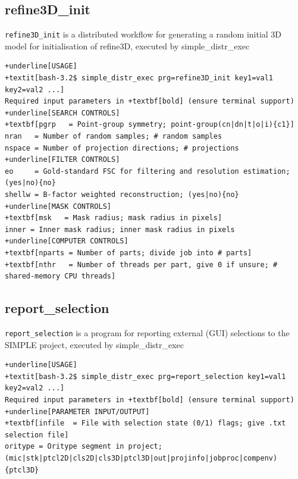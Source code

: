 \documentclass[a4paper,11pt]{article}
\newcommand{\prgname}[1]{\textcolor{NavyBlue}{\texttt{#1}}}
\begin{document}
\subsection{refine3D\_init}
\label{refine3D_init}
\prgname{refine3D\_init} is a distributed workflow for generating a random initial 3D model for initialisation of refine3D, executed by simple\_distr\_exec
\begin{Verbatim}[commandchars=+\[\],fontsize=\small,breaklines=true]
+underline[USAGE]
+textit[bash-3.2$ simple_distr_exec prg=refine3D_init key1=val1 key2=val2 ...]
Required input parameters in +textbf[bold] (ensure terminal support)
+underline[SEARCH CONTROLS]
+textbf[pgrp   = Point-group symmetry; point-group(cn|dn|t|o|i){c1}]
nran   = Number of random samples; # random samples
nspace = Number of projection directions; # projections
+underline[FILTER CONTROLS]
eo     = Gold-standard FSC for filtering and resolution estimation; (yes|no){no}
shellw = B-factor weighted reconstruction; (yes|no){no}
+underline[MASK CONTROLS]
+textbf[msk   = Mask radius; mask radius in pixels]
inner = Inner mask radius; inner mask radius in pixels
+underline[COMPUTER CONTROLS]
+textbf[nparts = Number of parts; divide job into # parts]
+textbf[nthr   = Number of threads per part, give 0 if unsure; # shared-memory CPU threads]
\end{Verbatim}

\subsection{report\_selection}
\label{report_selection}
\prgname{report\_selection} is a program for reporting external (GUI) selections to the SIMPLE project, executed by simple\_distr\_exec
\begin{Verbatim}[commandchars=+\[\],fontsize=\small,breaklines=true]
+underline[USAGE]
+textit[bash-3.2$ simple_distr_exec prg=report_selection key1=val1 key2=val2 ...]
Required input parameters in +textbf[bold] (ensure terminal support)
+underline[PARAMETER INPUT/OUTPUT]
+textbf[infile  = File with selection state (0/1) flags; give .txt selection file]
oritype = Oritype segment in project; (mic|stk|ptcl2D|cls2D|cls3D|ptcl3D|out|projinfo|jobproc|compenv){ptcl3D}
\end{Verbatim}
\end{document}
